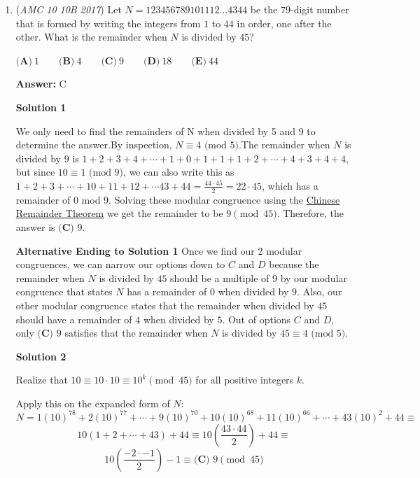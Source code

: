 \begin{enumerate}
 


	\item (\textit{AMC 10 10B 2017}) Let $N=123456789101112\dots4344$ be the $79$-digit number that is formed by writing the integers from $1$ to $44$ in order, one after the other. What is the remainder when $N$ is divided by $45$?


 $\textbf{(A)}\ 1\qquad\textbf{(B)}\ 4\qquad\textbf{(C)}\ 9\qquad\textbf{(D)}\ 18\qquad\textbf{(E)}\ 44$

 \textbf{Answer: }C



\textbf{Solution 1}

We only need to find the remainders of N when divided by 5 and 9 to determine the answer.By inspection, $N \equiv 4 \text{ (mod 5)}$.The remainder when $N$ is divided by $9$ is $1+2+3+4+ \cdots +1+0+1+1 +1+2 +\cdots + 4+3+4+4$, but since $10 \equiv 1 \text{ (mod 9)}$, we can also write this as $1+2+3 +\cdots +10+11+12+ \cdots 43 + 44 = \frac{44 \cdot 45}2 = 22 \cdot 45$, which has a remainder of 0 mod 9. Solving these modular congruence using the \href{https://artofproblemsolving.com/wiki/index.php?title=Chinese\_Remainder\_Theorem}{Chinese Remainder Theorem} we get the remainder to be $9 \pmod{45}$. Therefore, the answer is $\boxed{\textbf{(C) } 9}$.

 \textbf{Alternative Ending to Solution 1} Once we find our 2 modular congruences, we can narrow our options down to ${C}$ and ${D}$ because the remainder when $N$ is divided by $45$ should be a multiple of 9 by our modular congruence that states $N$ has a remainder of $0$ when divided by $9$. Also, our other modular congruence states that the remainder when divided by $45$ should have a remainder of $4$ when divided by $5$. Out of options $C$ and $D$, only $\boxed{\textbf{(C) } 9}$ satisfies that the remainder when $N$ is divided by $45 \equiv 4 \text{ (mod 5)}$.

 



\textbf{Solution 2}

Realize that $10 \equiv 10 \cdot 10 \equiv 10^{k} \pmod{45}$ for all positive integers $k$.

 Apply this on the expanded form of $N$:
 \[N = 1(10)^{78} + 2(10)^{77} + \cdots + 9(10)^{70} + 10(10)^{68} + 11(10)^{66} + \cdots + 43(10)^{2} + 44 \equiv\]
 \[10(1 + 2 + \cdots + 43) + 44 \equiv 10 \left (\frac{43 \cdot 44}2 \right ) + 44 \equiv\]
 \[10 \left (\frac{-2 \cdot -1}2 \right ) - 1 \equiv \boxed{\textbf{(C) } 9} \pmod{45}\]





\end{enumerate}
